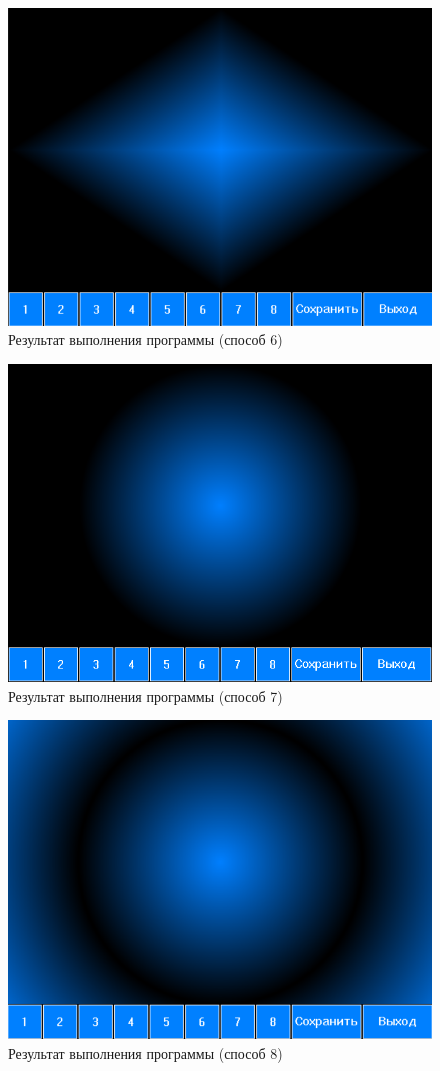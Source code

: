\documentclass[14pt, a4paper]{extreport}
\begin{document}
\begin{figure}[h!]
	\centering
	\includegraphics[width = 12cm]{image/image_6}
  \caption{Результат выполнения программы (способ 6)}
\end{figure}

\begin{figure}[h!]
	\centering
	\includegraphics[width = 12cm]{image/image_7}
  \caption{Результат выполнения программы (способ 7)}
\end{figure}

\begin{figure}[h!]
	\centering
	\includegraphics[width = 12cm]{image/image_8}
  \caption{Результат выполнения программы (способ 8)}
\end{figure}

\end{document}
